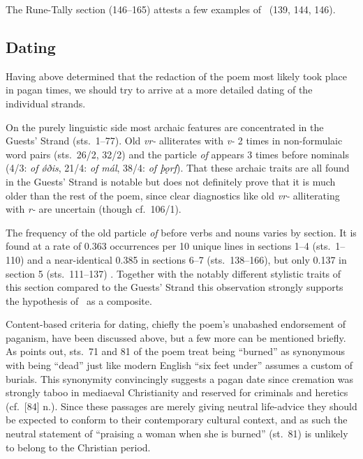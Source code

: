 The Rune-Tally section (146--165) attests a few examples of \Fornyrdislag\ (139, 144, 146).

\subsection{Dating}

Having above determined that the redaction of the poem most likely took place in pagan times, we should try to arrive at a more detailed dating of the individual strands.

On the purely linguistic side most archaic features are concentrated in the Guests’ Strand (sts.~1--77).  Old \emph{vr-} alliterates with \emph{v-} 2 times in non-formulaic word pairs (sts.~26/2, 32/2) and the particle \emph{of} appears 3 times before nominals (4/3: \emph{of ǿðis}, 21/4: \emph{of mál}, 38/4: \emph{of þǫrf}).  That these archaic traits are all found in the Guests’ Strand is notable but does not definitely prove that it is much older than the rest of the poem, since clear diagnostics like old \emph{vr-} alliterating with \emph{r-} are uncertain (though cf.~106/1).

The frequency of the old particle \emph{of} before verbs and nouns varies by section.  It is found at a rate of 0.363 occurrences per 10 unique lines in sections 1--4 (sts.~1--110) and a near-identical 0.385 in sections 6--7 (sts.~138--166), but only 0.137 in section 5 (sts.~111--137) \parencite[70]{Sapp2022}.  Together with the notably different stylistic traits of this section compared to the Guests’ Strand this observation strongly supports the hypothesis of \Havamal\ as a composite.

Content-based criteria for dating, chiefly the poem’s unabashed endorsement of paganism, have been discussed above, but a few more can be mentioned briefly.  As \textcite[93--96]{Males2024Hav} points out, sts.~71 and 81 of the poem treat being “burned” as synonymous with being “dead” just like modern English “six feet under” assumes a custom of burials.
This synonymity convincingly suggests a pagan date since cremation was strongly taboo in mediaeval Christianity and reserved for criminals and heretics (cf.~[84] n.).  Since these passages are merely giving neutral life-advice they should be expected to conform to their contemporary cultural context, and as such the neutral statement of “praising a woman when she is burned” (st.~81) is unlikely to belong to the Christian period.

\newpage

